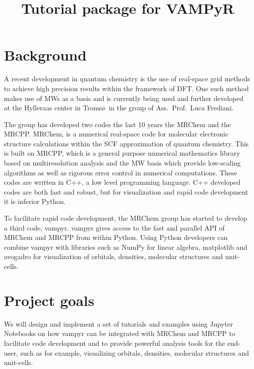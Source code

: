 \documentclass[12pt]{article}
\begin{document}
\title{Tutorial package for VAMPyR}

\maketitle

\section{Background}

A recent development in quantum chemistry is the use of real-space grid
methods to achieve high precision results within the framework of
\ac{DFT}. One such method makes use of \acp{MW} as a
basis\cite{harrison2003multiresolution}
and is currently being used and further developed at the Hylleraas
center in Troms\o \, in the group of Ass.~Prof.~Luca Frediani\cite{frediani2013fully}.

The group has developed two codes the last 10 years the \ac{MRChem}\cite{mrchem} and
the \ac{MRCPP}\cite{mrcpp}.
\ac{MRChem}, is
a numerical real-space code for molecular electronic structure calculations
within the \ac{SCF} approximation of quantum chemistry. This is built on
\ac{MRCPP}, which is a general purpose numerical mathematics library
based on multiresolution analysis and the \ac{MW} basis which provide
low-scaling algorithms as well as rigorous error control in numerical
computations. These codes are written in C++, a low level programming language.
C++ developed codes are both fast and robust, but for visualization and
rapid code development it is inferior Python.

To facilitate rapid code development,
the \ac{MRChem} group has started to develop a third code,
\ac{vampyr}\cite{vampyr}. \ac{vampyr} gives access to the
fast and parallel \ac{API}
of \ac{MRChem} and \ac{MRCPP} from within Python. Using Python developers can
combine \ac{vampyr} with libraries such as NumPy for linear algebra, matplotlib\cite{matplotlib}
and avogadro\cite{avogadro} for visualization of orbitals, densities, molecular structures
and unit-cells.

\section{Project goals}

We will design and implement a set of tutorials and examples
using Jupyter Notebooks\cite{jupyter} on how
\ac{vampyr} can be integrated with \ac{MRChem} and \ac{MRCPP} to
facilitate code development and to provide powerful analysis tools for
the end-user, such as for example, visualizing orbitals, densities,
molecular structures and unit-cells.
\end{document}
